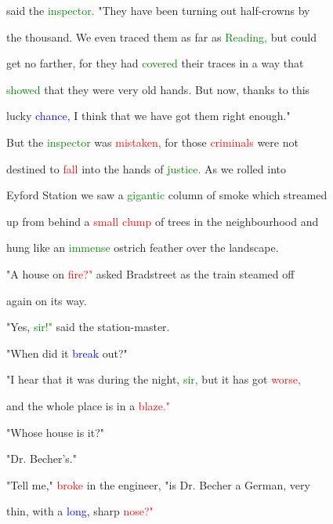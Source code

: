  said the \textcolor{green}{inspector.} "They have been turning out half-crowns by

 the thousand. We even traced them as far as \textcolor{green}{Reading,} but could

 get no farther, for they had \textcolor{green}{covered} their traces in a way that

 \textcolor{green}{showed} that they were very old hands. But now, thanks to this

 \textcolor{BurntOrange}{lucky} \textcolor{blue}{chance,} I think that we have got them right enough."



 But the \textcolor{green}{inspector} was \textcolor{red}{mistaken,} for those \textcolor{red}{criminals} were not

 destined to \textcolor{red}{fall} into the hands of \textcolor{green}{justice.} As we rolled into

 Eyford Station we saw a \textcolor{green}{gigantic} column of smoke which streamed

 up from behind a \textcolor{red}{small} \textcolor{red}{clump} of \textcolor{BurntOrange}{trees} in the neighbourhood and

 hung like an \textcolor{green}{immense} ostrich feather over the landscape.



 "A house on \textcolor{red}{fire?"} asked Bradstreet as the train steamed off

 again on its way.



 "Yes, \textcolor{green}{sir!"} said the station-master.



 "When did it \textcolor{blue}{break} out?"



 "I hear that it was during the night, \textcolor{green}{sir,} but it has got \textcolor{red}{worse,}

 and the whole place is in a \textcolor{red}{blaze."}



 "Whose house is it?"



 "Dr. Becher's."



 "Tell me," \textcolor{red}{broke} in the engineer, "is Dr. Becher a German, very

 thin, with a \textcolor{blue}{long,} sharp \textcolor{red}{nose?"}



